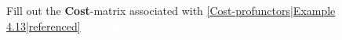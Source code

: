 
Fill out the \textbf{Cost}-matrix associated with \ref{Cost-profunctors|Example 4.13|referenced} \textcolor{white}{NOCARD}